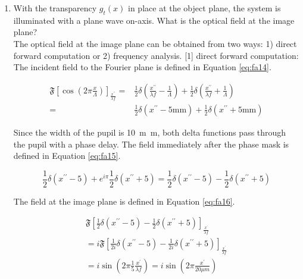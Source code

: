 \documentclass[main.tex]{subfiles}
\begin{document}
\begin{enumerate}
\begin{enumerate}
\item{With the transparency $g_t(x)$ in place at the object plane, the system is illuminated with a plane wave on-axis. What is the optical field at the image plane?}\\

The optical field at the image plane can be obtained from two ways: 1) direct forward computation or 2) frequency analysis. [1] direct forward computation: The incident field to the Fourier plane is defined in Equation \ref{eq:fa14}.


\begin{equation}\label{eq:fa14}
\begin{aligned} 
\mathfrak{F}\left[\cos \left(2 \pi \frac{x}{\Lambda}\right)\right]_{\frac{x^{\prime \prime}}{\lambda f}} =
& \frac{1}{2} \delta\left(\frac{x^{\prime \prime}}{\lambda f}-\frac{1}{\Lambda}\right)+\frac{1}{2} \delta\left(\frac{x^{\prime \prime}}{\lambda f}+\frac{1}{\Lambda}\right)\\
                                                                                                       =& \frac{1}{2} \delta\left(x^{\prime \prime}-5 \mathrm{mm}\right)+\frac{1}{2} \delta\left(x^{\prime \prime}+5 \mathrm{mm}\right)
\end{aligned}
\end{equation}

Since the width of the pupil is \SI{10}{m\metre}, both delta functions pass through the pupil with a phase delay. The field immediately after the phase mask is defined in Equation \ref{eq:fa15}.

\begin{equation}\label{eq:fa15}
\frac{1}{2} \delta\left(x^{\prime \prime}-5\right)+e^{i \pi} \frac{1}{2} \delta\left(x^{\prime \prime}+5\right) =\frac{1}{2} \delta\left(x^{\prime \prime}-5\right)-\frac{1}{2} \delta\left(x^{\prime \prime}+5\right)
\end{equation}

The field at the image plane is defined in Equation \ref{eq:fa16}.

\begin{equation}\label{eq:fa16}
\begin{aligned} 
\mathfrak{F}\left[\frac{1}{2} \delta\left(x^{\prime \prime}-5\right)-\frac{1}{2} \delta\left(x^{\prime \prime}+5\right)\right]_{\frac{x^{\prime}}{\lambda f}}\\
=i \mathfrak{F}\left[\frac{1}{2 i} \delta\left(x^{\prime \prime}-5\right)-\frac{1}{2 i} \delta\left(x^{\prime \prime}+5\right)\right]_{\frac{x^{\prime}}{\lambda f}} \\
=i \sin \left(2 \pi \frac{1}{5} \frac{x^{\prime}}{\lambda f}\right)=i \sin \left(2 \pi \frac{x^{\prime}}{20 \mu m}\right) 
\end{aligned}
\end{equation}


\end{enumerate}
\end{enumerate}
\end{document}
